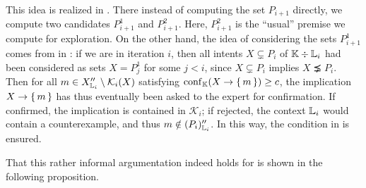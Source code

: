This idea is realized in .
There instead of computing the set $P_{i+1}$ directly, we compute two candidates
$P_{i+1}^{1}$ and $P_{i+1}^{2}$.  Here, $P_{i+1}^{2}$ is the ``usual'' premise we compute
for exploration.  On the other hand, the idea of considering the sets $P_{i+1}^{1}$ comes
from  in : if we are in iteration
$i$, then all intents $X \subsetneq P_{i}$ of ${\mathbb{K}} \div {\ensuremath{\mathbb{L}}}_{i}$ had been considered
as sets $X = P_{j}^{1}$ for some $j < i$, since $X \subsetneq P_{i}$ implies $X \precneq
P_{i}$.  Then for all $m \in X_{{\mathbb{L}}_{i}}'' \setminus \mathcal{K}_{i}(X)$ satisfying
$\operatorname{conf}_{{\mathbb{K}}}(X \to {\ensuremath{\{\,m\,\}}}) \ge c$, the implication $X \to {\ensuremath{\{\,m\,\}}}$ has thus eventually
been asked to the expert for confirmation.  If confirmed, the implication is contained in
$\mathcal{K}_{i}$; if rejected, the context ${\mathbb{L}}_{i}$ would contain a counterexample,
and thus $m \notin (P_{i})_{{\mathbb{L}}_{i}}''$.  In this way, the condition in  is
ensured.

That this rather informal argumentation indeed holds for
 is shown in the following
proposition.

